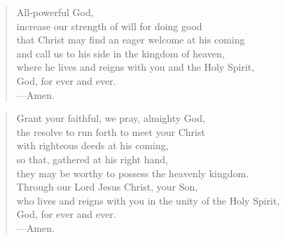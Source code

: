 \prayer

\setlength{\vleftmargin}{\prayerleftmargini}

\begin{verse}
All-powerful God,\\
increase our strength of will for doing good\\
that Christ may find an eager welcome at his coming\\
and call us to his side in the kingdom of heaven,\\
where he lives and reigns with you and the Holy Spirit,\\
God, for ever and ever.\\
{\color{red}---\thinspace}Amen.
\end{verse}


\begin{verse}
Grant your faithful, we pray, almighty God,\\
the resolve to run forth to meet your Christ\\
with righteous deeds at his coming,\\
so that, gathered at his right hand,\\
they may be worthy to possess the heavenly kingdom.\\
Through our Lord Jesus Christ, your Son,\\
who lives and reigns with you in the unity of the Holy Spirit,\\
God, for ever and ever.\\
{\color{red}---\thinspace}Amen.
\end{verse}

\setlength{\vleftmargin}{\defleftmargini}